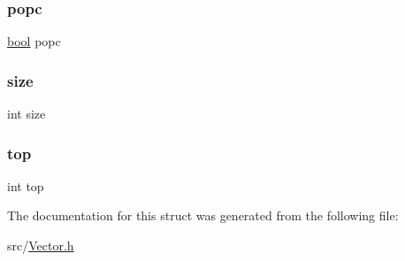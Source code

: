 \mbox{\label{structvector_a2679cd033e6388e644c68ded9ce1fba4}} 
\subsubsection{\texorpdfstring{popc}{popc}}
{\footnotesize\ttfamily \hyperlink{_consts_8h_af6a258d8f3ee5206d682d799316314b1}{bool} popc}

\mbox{\label{structvector_a439227feff9d7f55384e8780cfc2eb82}} 
\subsubsection{\texorpdfstring{size}{size}}
{\footnotesize\ttfamily int size}

\mbox{\label{structvector_af93f4f37fc2ad9c37af4a715423b110c}} 
\subsubsection{\texorpdfstring{top}{top}}
{\footnotesize\ttfamily int top}



The documentation for this struct was generated from the following file\+:\begin{DoxyCompactItemize}
\item 
src/\hyperlink{_vector_8h}{Vector.\+h}\end{DoxyCompactItemize}
